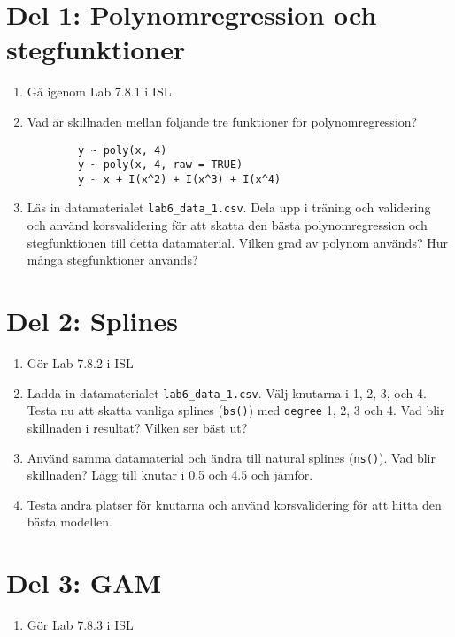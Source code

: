 \documentclass[a4paper]{article}
\begin{document}
\section*{Del 1: Polynomregression och stegfunktioner}

\begin{enumerate}
    \item Gå igenom Lab 7.8.1 i ISL
    \item Vad är skillnaden mellan följande tre funktioner för polynomregression?
    \begin{verbatim}
        y ~ poly(x, 4)
        y ~ poly(x, 4, raw = TRUE)
        y ~ x + I(x^2) + I(x^3) + I(x^4)
    \end{verbatim}
    \item Läs in datamaterialet \texttt{lab6\_data\_1.csv}. Dela upp i träning och validering och använd korsvalidering för att skatta den bästa polynomregression och stegfunktionen till detta datamaterial. Vilken grad av polynom används? Hur många stegfunktioner används?
\end{enumerate}

\section*{Del 2: Splines}

\begin{enumerate}
    \item Gör Lab 7.8.2 i ISL
    \item Ladda in datamaterialet \texttt{lab6\_data\_1.csv}. Välj knutarna i 1, 2, 3, och 4. Testa nu att skatta vanliga splines (\texttt{bs()}) med \texttt{degree} 1, 2, 3 och 4. Vad blir skillnaden i resultat? Vilken ser bäst ut?
    \item Använd samma datamaterial och ändra till natural splines (\texttt{ns()}). Vad blir skillnaden? Lägg till knutar i 0.5 och 4.5 och jämför.
    \item Testa andra platser för knutarna och använd korsvalidering för att hitta den bästa modellen.
\end{enumerate}

\section*{Del 3: GAM}
\begin{enumerate}
    \item Gör Lab 7.8.3 i ISL
\end{enumerate}
\end{document}
